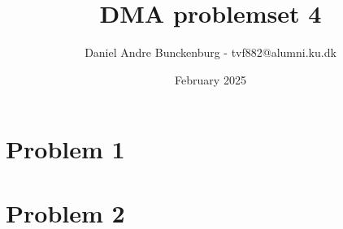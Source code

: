 \documentclass{article}
\title{DMA problemset 4}
\author{Daniel Andre Bunckenburg - tvf882@alumni.ku.dk}
\date{February 2025}
\begin{document}
\maketitle


\section*{Problem 1}

\section*{Problem 2}
\end{document}
